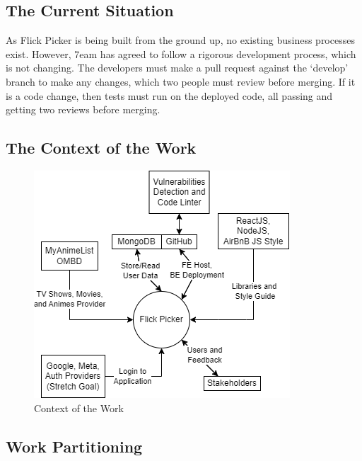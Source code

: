 \documentclass[12pt]{article}
\begin{document}
\subsection{The Current Situation}
As Flick Picker is being built from the ground up, no existing business processes exist. However, 7eam has agreed to follow a rigorous development process, which is not changing. The developers must make a pull request against the `develop' branch to make any changes, which two people must review before merging. If it is a code change, then tests must run on the deployed code, all passing and getting two reviews before merging.

\pagebreak

\subsection{The Context of the Work}

\begin{figure}[h]
	\begin{center}
		\includegraphics[scale=1]{contextDiagram.png}
	\end{center}
	\caption{Context of the Work}
\end{figure}


\subsection{Work Partitioning}
\end{document}

